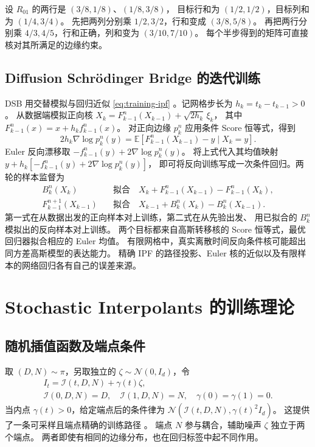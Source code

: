 \begin{example}
设 \(R_{01}\) 的两行是 \((3/8,1/8)\)、\((1/8,3/8)\)，
目标行和为 \((1/2,1/2)\)，目标列和为 \((1/4,3/4)\)。
先把两列分别乘 \(1/2,3/2\)，行和变成 \((3/8,5/8)\)。
再把两行分别乘 \(4/3,4/5\)，行和正确，列和变为 \((3/10,7/10)\)。
每个半步得到的矩阵可直接核对其所满足的边缘约束。
\end{example}

\subsection{Diffusion Schrödinger Bridge 的迭代训练}

DSB 用交替模拟与回归近似 \eqref{eq:training-ipf}
\cite{debortoli2021dsb}。记网格步长为 \(h_k=t_k-t_{k-1}>0\)。
从数据端模拟正向核
\(X_k=F_{k-1}^n(X_{k-1})+\sqrt{2h_k}\,\xi_k\)，
其中 \(F_{k-1}^n(x)=x+h_k f_{k-1}^n(x)\)。
对正向边缘 \(p_k^n\) 应用条件 Score 恒等式，得到
\[
  2h_k\nabla\log p_k^n(y)=
    \mathbb E[F_{k-1}^n(X_{k-1})-y\mid X_k=y].
\]
Euler 反向漂移取 \(-f_{k-1}^n(y)+2\nabla\log p_k^n(y)\)。
将上式代入其均值映射 \(y+h_k[-f_{k-1}^n(y)+2\nabla\log p_k^n(y)]\)，
即可将反向训练写成一次条件回归。两轮的样本监督为
\begin{equation}
  \begin{aligned}
  B_k^n(X_k)&\quad\text{拟合}\quad
      X_k+F_{k-1}^n(X_{k-1})-F_{k-1}^n(X_k),\\
  F_{k-1}^{n+1}(X_{k-1})&\quad\text{拟合}\quad
      X_{k-1}+B_k^n(X_k)-B_k^n(X_{k-1}).
  \end{aligned}
  \label{eq:training-dsb-regression}
\end{equation}
第一式在从数据出发的正向样本对上训练，第二式在从先验出发、
用已拟合的 \(B_k^n\) 模拟出的反向样本对上训练。
两个目标都来自高斯转移核的 Score 恒等式，最优回归器拟合相应的 Euler 均值。
有限网格中，真实离散时间反向条件核可能超出同方差高斯模型的表达能力。
精确 IPF 的路径投影、Euler 核的近似以及有限样本的网络回归各有自己的误差来源。

\section{Stochastic Interpolants 的训练理论}
\label{sec:training-si}

\subsection{随机插值函数及端点条件}

取 \((D,N)\sim\pi\)，另取独立的 \(\zeta\sim\mathcal N(0,I_d)\)，令
\begin{equation}
  \begin{gathered}
  I_t=\mathcal I(t,D,N)+\gamma(t)\zeta,\\
  \mathcal I(0,D,N)=D,\quad\mathcal I(1,D,N)=N,\quad
  \gamma(0)=\gamma(1)=0.
  \end{gathered}
  \label{eq:training-si-path}
\end{equation}
当内点 \(\gamma(t)>0\)，给定端点后的条件律为
\(\mathcal N(\mathcal I(t,D,N),\gamma(t)^2 I_d)\)。
这提供了一条可采样且端点精确的训练路径 \cite{albergo2025si}。
端点 \(N\) 参与耦合，辅助噪声 \(\zeta\) 独立于两个端点。
两者即使有相同的边缘分布，也在回归标签中起不同作用。

